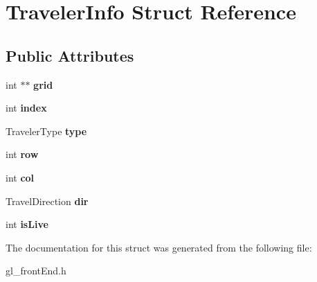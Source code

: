\hypertarget{structTravelerInfo}{}\section{Traveler\+Info Struct Reference}
\label{structTravelerInfo}
\subsection*{Public Attributes}
\begin{DoxyCompactItemize}
\item 
\mbox{\label{structTravelerInfo_ae28b93b44980ca8fd07cd2a746668b03}} 
int $\ast$$\ast$ {\bfseries grid}
\item 
\mbox{\label{structTravelerInfo_a7f162bd67263993b8c9017750e82f048}} 
int {\bfseries index}
\item 
\mbox{\label{structTravelerInfo_a07f1d22f002bb328c95cb78c6b3dfbbe}} 
Traveler\+Type {\bfseries type}
\item 
\mbox{\label{structTravelerInfo_ab60d92c1c16aea0ad1b4009034b06c59}} 
int {\bfseries row}
\item 
\mbox{\label{structTravelerInfo_abe36cac7dc9a0b5cbd5177d6c9a91611}} 
int {\bfseries col}
\item 
\mbox{\label{structTravelerInfo_ab71e74f311a78c5bdfeb5f108738e783}} 
Travel\+Direction {\bfseries dir}
\item 
\mbox{\label{structTravelerInfo_a7e38135d26b660bd6847b8e133ef0515}} 
int {\bfseries is\+Live}
\end{DoxyCompactItemize}


The documentation for this struct was generated from the following file\+:\begin{DoxyCompactItemize}
\item 
gl\+\_\+front\+End.\+h\end{DoxyCompactItemize}
